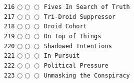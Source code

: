\documentclass[a4paper,landscape]{article}
\begin{document}
\begin{multicols*}{5}
\texttt{216} \(\bigcirc\!\bigcirc\!\bigcirc\)  \texttt{Fives In Search of Truth} \vspace{-0.3mm}\\ 
\texttt{217} \(\bigcirc\!\bigcirc\!\bigcirc\)  \texttt{Tri-Droid Suppressor} \vspace{-0.3mm}\\ 
\texttt{218} \(\bigcirc\!\bigcirc\!\bigcirc\)  \texttt{Droid Cohort} \vspace{-0.3mm}\\ 
\texttt{219} \(\bigcirc\!\bigcirc\!\bigcirc\)  \texttt{On Top of Things} \vspace{-0.3mm}\\ 
\texttt{220} \(\bigcirc\!\bigcirc\!\bigcirc\)  \texttt{Shadowed Intentions} \vspace{-0.3mm}\\ 
\texttt{221} \(\bigcirc\!\bigcirc\!\bigcirc\)  \texttt{In Pursuit} \vspace{-0.3mm}\\ 
\texttt{222} \(\bigcirc\!\bigcirc\!\bigcirc\)  \texttt{Political Pressure} \vspace{-0.3mm}\\ 
\texttt{223} \(\bigcirc\!\bigcirc\!\bigcirc\)  \texttt{Unmasking the Conspiracy} \vspace{-0.3mm}\\ 

\end{multicols*}
\end{document}
